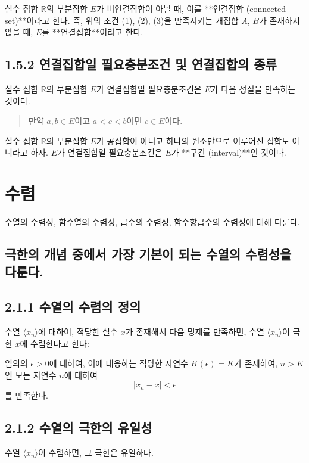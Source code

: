 \documentclass{article}
\begin{document}
실수 집합 $\mathbb{R}$의 부분집합 $E$가 비연결집합이 아닐 때, 이를 **연결집합 (connected set)**이라고 한다.  
즉, 위의 조건 (1), (2), (3)을 만족시키는 개집합 $A$, $B$가 존재하지 않을 때, $E$를 **연결집합**이라고 한다.



\subsection*{\textmd{1.5.2 연결집합일 필요충분조건 및 연결집합의 종류}}
실수 집합 $\mathbb{R}$의 부분집합 $E$가 연결집합일 필요충분조건은 $E$가 다음 성질을 만족하는 것이다.

\begin{quote}
    만약 $a, b \in E$이고 $a < c < b$이면 $c \in E$이다.
\end{quote}
실수 집합 $\mathbb{R}$의 부분집합 $E$가 공집합이 아니고 하나의 원소만으로 이루어진 집합도 아니라고 하자.  
$E$가 연결집합일 필요충분조건은 $E$가 **구간 (interval)**인 것이다.


\setcounter{section}{1}

\section{수렴}
수열의 수렴성, 함수열의 수렴성, 급수의 수렴성, 함수항급수의 수렴성에 대해 다룬다.

\subsection{극한의 개념 중에서 가장 기본이 되는 수열의 수렴성을 
다룬다.}

\subsection*{\textmd{2.1.1 수열의 수렴의 정의}}
수열 \( \langle x_n \rangle \)에 대하여, 적당한 실수 \( x \)가 존재해서 다음 명제를 만족하면, 수열 \( \langle x_n \rangle \)이 극한 \( x \)에 수렴한다고 한다:

임의의 \( \epsilon > 0 \)에 대하여, 이에 대응하는 적당한 자연수 \( K(\epsilon) = K \)가 존재하여, \( n > K \)인 모든 자연수 \( n \)에 대하여  
\[
|x_n - x| < \epsilon
\]
를 만족한다.

\subsection*{\textmd{2.1.2 수열의 극한의 유일성}}
수열 \( \langle x_n \rangle \)이 수렴하면, 그 극한은 유일하다.
\end{document}
